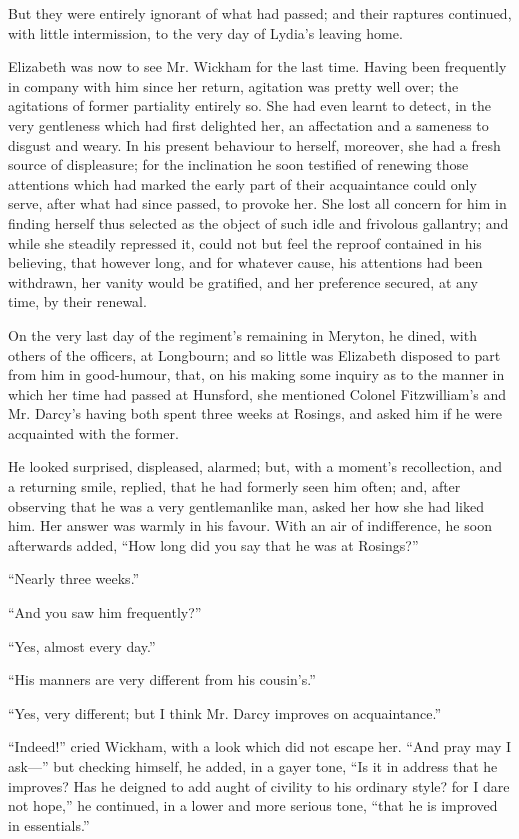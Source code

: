 \documentclass[10pt]{book}
\begin{document}
   But they were entirely ignorant of what had passed;
   and their raptures
continued, with little intermission, to the very day of Lydia’s leaving
home.
  

   Elizabeth was now to see Mr. Wickham for the last time. Having been
frequently in company with him since her return, agitation was pretty
well over; the agitations of former partiality entirely so. She had even
learnt to detect, in the very gentleness which had first delighted her,
an affectation and a sameness to disgust and weary. In his present
behaviour to herself, moreover, she had a fresh source of displeasure;
for the inclination he soon testified of renewing those attentions which
had marked the early part of their acquaintance could only serve, after
what had since passed, to provoke her. She lost all concern for him in
finding herself thus selected as the object of such idle and frivolous
gallantry; and while she steadily repressed it, could not but feel the
reproof contained in his believing, that however long, and for whatever
cause, his attentions had been withdrawn, her vanity would be gratified,
and her preference secured, at any time, by their renewal.
  

   On the very last day of the regiment’s remaining in Meryton, he dined,
with others of the officers, at Longbourn; and so little was Elizabeth
disposed to part from him in good-humour, that, on his making some
inquiry as to the manner in which her time had passed at Hunsford, she
mentioned Colonel Fitzwilliam’s and Mr. Darcy’s having both spent three
weeks at Rosings, and asked him if he were acquainted with the former.
  

   He looked surprised, displeased, alarmed; but, with a moment’s
recollection, and a returning smile, replied, that he had formerly seen
him often; and, after observing that he was a very gentlemanlike man,
asked her how she had liked him. Her answer was warmly in
   his favour.
With an air of indifference, he soon afterwards added, “How long did you
say that he was at Rosings?”
  

   “Nearly three weeks.”
  

   “And you saw him frequently?”
  

   “Yes, almost every day.”
  

   “His manners are very different from his cousin’s.”
  

   “Yes, very different; but I think Mr. Darcy improves on acquaintance.”
  

   “Indeed!” cried Wickham, with a look which did not escape her. “And pray
may I ask—” but checking himself, he added, in a gayer tone, “Is it in
address that he improves? Has he deigned to add aught of civility to his
ordinary style? for I dare not hope,” he continued, in a lower and more
serious tone, “that he is improved in essentials.”
  
\end{document}
